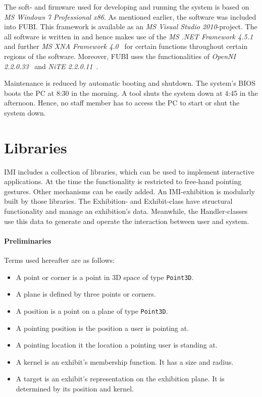 The soft- and firmware used for developing and running the system is based on \textit{\ac{MS} Windows 7 Professional x86}. As mentioned earlier, the software was included into \ac{FUBI}. This framework is available as an \textit{\ac{MS} Visual Studio 2010}-project. The all software is written in  and hence makes use of the \textit{\ac{MS} .NET Framework 4.5.1}~\cite{MSNET} and further \textit{\ac{MS} XNA Framework 4.0}~\cite{MSXNA} for certain functions throughout certain regions of the software. Moreover, \ac{FUBI} uses the functionalities of \textit{OpenNI 2.2.0.33}~\cite{OpenNI} and \textit{NiTE 2.2.0.11}~\cite{NiTE}.

Maintenance is reduced by automatic booting and shutdown. The system's BIOS boots the PC at 8:30 in the morning. A tool shuts the system down at 4:45 in the afternoon. Hence, no staff member has to access the PC to start or shut the system down.


\section{Libraries}
\label{implementation_libraries}

\ac{IMI} includes a collection of libraries, which can be used to implement interactive applications. At the time the functionality is restricted to free-hand pointing gestures. Other mechanisms can be easily added. An \ac{IMI}-exhibition is modularly built by those libraries. The Exhibition- and Exhibit-class have structural functionality and manage an exhibition's data. Meanwhile, the Handler-classes use this data to generate and operate the interaction between user and system.

\paragraph{Preliminaries} Terms used hereafter are as follows:
\begin{itemize}
	\item A point or corner is a point in \ac{3D} space of type \texttt{Point3D}.
	\item A plane is defined by three points or corners. 
	\item A position is a point on a plane of type \texttt{Point3D}.
	\item A pointing position is the position a user is pointing at.
	\item A pointing location it the location a pointing user is standing at.
	\item A kernel is an exhibit's membership function. It has a size and radius.
	\item A target is an exhibit's representation on the exhibition plane. It is determined by its position and kernel.
\end{itemize}

